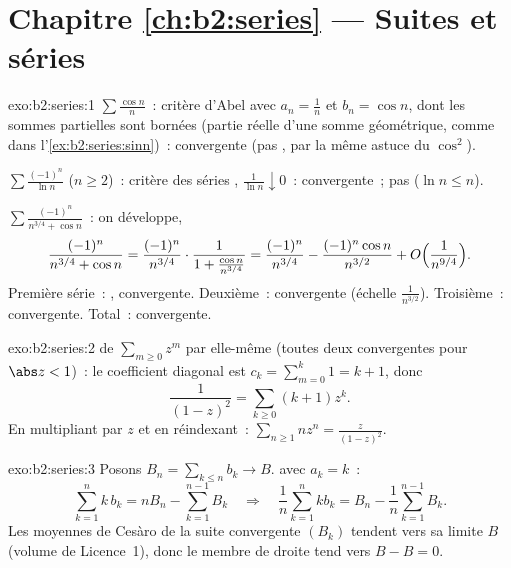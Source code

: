 \section*{Chapitre \ref{ch:b2:series} --- Suites et séries}

\begin{solution}{exo:b2:series:1}
$\sum\frac{\cos n}{n}$~: critère d'Abel avec $a_n = \frac1n$ et $b_n =
\cos n$, dont les sommes partielles sont bornées (partie réelle d'une
somme géométrique, comme dans l'\cref{ex:b2:series:sinn})~: convergente
(pas , par la même astuce du $\cos^2$).

$\sum \frac{(-1)^n}{\ln n}$ ($n \geq 2$)~: critère des séries
, $\frac{1}{\ln n} \downarrow 0$~: convergente~; pas
 ($\ln n \leq n$).

$\sum \frac{(-1)^n}{n^{3/4} + \cos n}$~: on développe,
\[
\frac{(-1)^n}{n^{3/4} + \cos n}
= \frac{(-1)^n}{n^{3/4}}\cdot
\frac{1}{1 + \frac{\cos n}{n^{3/4}}}
= \frac{(-1)^n}{n^{3/4}}
- \frac{(-1)^n\cos n}{n^{3/2}} + O\Bigl(\frac{1}{n^{9/4}}\Bigr).
\]
Première série~: , convergente. Deuxième~: 
convergente (échelle $\frac{1}{n^{3/2}}$). Troisième~: 
convergente. Total~: convergente.
\end{solution}

\begin{solution}{exo:b2:series:2}
 de $\sum_{m\geq0} z^m$ par elle-même (toutes deux
 convergentes pour $\abs z < 1$)~: le coefficient diagonal
est $c_k = \sum_{m=0}^{k} 1 = k + 1$, donc
\[
\frac{1}{(1-z)^2} = \sum_{k\geq0} (k+1)z^k .
\]
En multipliant par $z$ et en réindexant~: $\sum_{n \geq 1} n z^n =
\frac{z}{(1-z)^2}$.
\end{solution}

\begin{solution}{exo:b2:series:3}
Posons $B_n = \sum_{k \leq n} b_k \to B$.  avec
$a_k = k$~:
\[
\sum_{k=1}^{n} k\,b_k = n B_n - \sum_{k=1}^{n-1} B_k
\quad\Longrightarrow\quad
\frac1n \sum_{k=1}^{n} k b_k = B_n - \frac{1}{n}\sum_{k=1}^{n-1}
B_k .
\]
Les moyennes de Cesàro de la suite convergente $(B_k)$ tendent vers
sa limite $B$ (volume de Licence~1), donc le membre de droite tend
vers $B - B = 0$.
\end{solution}

